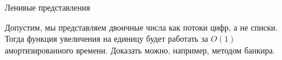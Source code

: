 \begin{frame}[fragile]{Ленивые представления}

Допустим, мы представляем двоичные числа как потоки цифр, а не списки. \\

Тогда функция увеличения на единицу  будет работать за $O(1)$ амортизированного времени. Доказать можно, например, методом банкира.

\begin{comment}
Заметим, что функция эта пошаговая.

В Разделе~\ref{sc:6.4.1} мы видели, как с помощью ленивого вычисления
можно заставить вставку в биномиальные кучи работать за
амортизированное время $O(1)$, так что нас не должно удивлять, что
наша новая версия \lstinline!inc! также работает за амортизированное
время $O(1)$. Мы доказываем это по методу банкира.

\emph{Доказательство.} Пусть каждая цифра ноль несет одну единицу долга, а
цифра единица~--- ноль единиц долга. Допустим, \lstinline!ds!
начинается с $k$ единиц (\lstinline!One!), а затем имеет ноль
(\lstinline!Zero!). Тогда \lstinline!inc ds! заменяет все эти \lstinline!One!
на \lstinline!Zero!, а \lstinline!Zero! на \lstinline!One!.
Выделим по одной единице долга на каждый
из этих шагов. Теперь у каждого элемента \lstinline!Zero! есть одна
единица долга, а у \lstinline!One! две: одна, унаследованная от
исходной задержки в этом месте, и одна, созданная только
что. Высвобождение этих двух единиц долга восстанавливает
инвариант. Поскольку амортизированная стоимость функции равна ее
нераздельной стоимости (здесь это $O(1)$) плюс число высвобождаемых
единиц долга (здесь две), \lstinline!inc! работает за амортизированное
время $O(1)$.

Рассмотрим теперь функцию уменьшения.
\begin{lstlisting}
  fun lazy dec ($\$$Cons (One, $\$$Nil)) = $\$$Nil
         | dec ($\$$Cons (One, ds)) = $\$$Cons (Zero, ds)
         | dec ($\$$Cons (Zero, ds)) = $\$$Cons (One, dec ds)
\end{lstlisting}
Поскольку эта функция подобна \lstinline!inc!, но
со сменой ролей цифр, можно ожидать, что при помощи подобного
доказательства мы получим такое же ограничение. Так оно и есть, если
мы не используем \emph{обе} функции. Однако если используются как
\lstinline!inc!, так и \lstinline!dec!, по крайней мере одной из них
приходится приписывать амортизированное время $O(\log n)$. Чтобы понять,
почему, представим последовательность увеличений и уменьшений,
циклически переходящих от $2^k - 1$ к $2^k$ и обратно. Каждая операция
при этом затрагивает каждую цифру, и общее время получается $O(\log
n)$.


\end{comment}
\end{frame}
